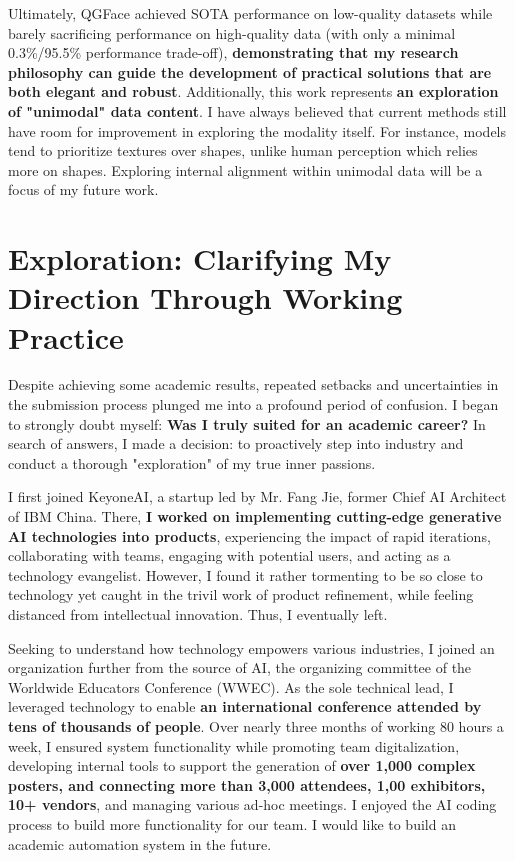 \documentclass[11pt, letterpaper]{article}
\let\oldtextbf\textbf
\renewcommand{\textbf}[1]{{\color{black}\oldtextbf{#1}}}
\begin{document}
Ultimately, QGFace achieved SOTA performance on low-quality datasets while barely sacrificing performance on high-quality data (with only a minimal 0.3\%/95.5\% performance trade-off), \textbf{demonstrating that my research philosophy can guide the development of practical solutions that are both elegant and robust}. Additionally, this work represents \textbf{an exploration of "unimodal" data content}. I have always believed that current methods still have room for improvement in exploring the modality itself. For instance, models tend to prioritize textures over shapes, unlike human perception which relies more on shapes. Exploring internal alignment within unimodal data will be a focus of my future work.

\section{Exploration: Clarifying My Direction Through Working Practice }

Despite achieving some academic results, repeated setbacks and uncertainties in the submission process plunged me into a profound period of confusion. I began to strongly doubt myself: \textbf{Was I truly suited for an academic career?} In search of answers, I made a decision: to proactively step into industry and conduct a thorough "exploration" of my true inner passions.

I first joined KeyoneAI, a startup led by Mr. Fang Jie, former Chief AI Architect of IBM China. There, \textbf{I worked on implementing cutting-edge generative AI technologies into products}, experiencing the impact of rapid iterations, collaborating with teams, engaging with potential users, and acting as a technology evangelist. However, I found it rather tormenting to be so close to technology yet caught in the trivil work of product refinement, while feeling distanced from intellectual innovation. Thus, I eventually left.

Seeking to understand how technology empowers various industries, I joined an organization further from the source of AI, the organizing committee of the Worldwide Educators Conference (WWEC)\cite{wwec}.
As the sole technical lead, I leveraged technology to enable \textbf{an international conference attended by tens of thousands of people}. Over nearly three months of working 80 hours a week, I ensured system functionality while promoting team digitalization, developing internal tools to support the generation of \textbf{over 1,000 complex posters, and connecting more than 3,000 attendees, 1,00 exhibitors, 10+ vendors}, and managing various ad-hoc meetings. I enjoyed the AI coding process to build more functionality for our team. I would like to build an academic automation system in the future.
\end{document}
